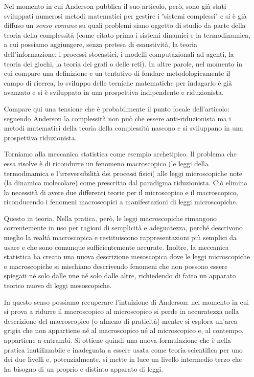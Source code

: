 \documentclass[a4paper, headings=standardclasses]{scrartcl}
\begin{document}
Nel momento in cui Anderson pubblica il suo articolo, però, sono già stati sviluppati numerosi metodi matematici per gestire i "sistemi complessi" e si è già diffuso un \textit{senso comune} su quali problemi siano oggetto di studio da parte della teoria della complessità (come citato prima i sistemi dinamici e la termodinamica, a cui possiamo aggiungere, senza pretesa di esaustività, la teoria dell'informazione, i processi stocastici, i modelli computazionali ad agenti, la teoria dei giochi, la teoria dei grafi o delle reti).
In altre parole, nel momento in cui compare una definizione e un tentativo di fondare metodologicamente il campo di ricerca, lo sviluppo delle tecniche matematiche per indagarlo è già avanzato e si è sviluppato in una prospettiva indipendente e riduzionista.

Compare qui una tensione che è probabilmente il punto focale dell'articolo: seguendo Anderson la complessità non può che essere anti-riduzionista ma i metodi matematici della teoria della complessità nascono e si sviluppano in una prospettiva riduzionista.

Torniamo alla meccanica statistica come esempio archetipico. Il problema che essa risolve è di ricondurre un fenomeno macroscopico (le leggi della termodinamica e l'irreversibilità dei processi fisici) alle leggi microscopiche note (la dinamica molecolare) come prescritto dal paradigma riduzionista.  Ciò elimina la necessità di avere due differenti teorie per il microscopico e il macroscopico, riconducendo i fenomeni macroscopici a manifestazioni di leggi microscopiche.

Questo in teoria. Nella pratica, però, le leggi macroscopiche rimangono correntemente in uso per ragioni di semplicità e adeguatezza, perché descrivono meglio la realtà macroscopica e restituiscono rappresentazioni più semplici da usare e che sono comunque sufficientemente accurate.
Inoltre, la meccanica statistica ha creato una nuova descrizione mesoscopica dove le leggi microscopiche e macroscopiche si mischiano descrivendo fenomeni che non possono essere spiegati né solo dalle une né solo dalle altre, richiedendo di fatto un apparato teorico nuovo di leggi mesoscopiche.

In questo senso possiamo recuperare l'intuizione di Anderson: nel momento in cui si prova a ridurre il macroscopico al microscopico si perde in accuratezza nella descrizione del macroscopico (o almeno di praticità) mentre si esplora un'area grigia che non appartiene né al macroscopico né al microscopico e, al contempo, appartiene a entrambi.
Si ottiene quindi una nuova formulazione che è nella pratica inutilizzabile e inadeguata a essere usata come teoria scientifica per uno dei due livelli e, potenzialmente, si mette in luce un livello intermedio terzo che ha bisogno di un proprio e distinto apparato di leggi.
\end{document}
